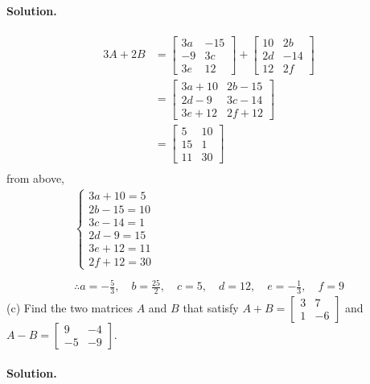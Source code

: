 \paragraph{Solution.}
\begin{align*}
    3A + 2B &= \begin{bmatrix}
        3a & -15\\
        -9 & 3c\\
        3e & 12
    \end{bmatrix} + \begin{bmatrix}
        10 & 2b\\
        2d & -14\\
        12 & 2f
    \end{bmatrix}\\
    &=\begin{bmatrix}
        3a + 10 & 2b - 15\\
        2d - 9 & 3c - 14\\
        3e + 12 & 2f + 12
    \end{bmatrix}\\
    &=\begin{bmatrix}
        5 & 10\\
        15 & 1\\
        11 & 30
    \end{bmatrix}\\
\end{align*}
from above,
\begin{gather*}
    \begin{cases}
        3a+10 = 5\\2b - 15 = 10\\3c - 14 = 1\\2d - 9 = 15\\3e + 12 = 11\\2f + 12 = 30
    \end{cases}\\\\
    \therefore a = -\frac{5}{3},\quad b = \frac{25}{2},\quad c = 5,\quad d = 12,\quad e = -\frac{1}{3},\quad f = 9
\end{gather*}
\newpage
(c) Find the two matrices $A$ and $B$ that satisfy $A + B = \begin{bmatrix}
    3&7\\1&-6
\end{bmatrix}$ and $A - B = \begin{bmatrix}
    9&-4\\-5&-9
\end{bmatrix}$.
\paragraph{Solution.}

